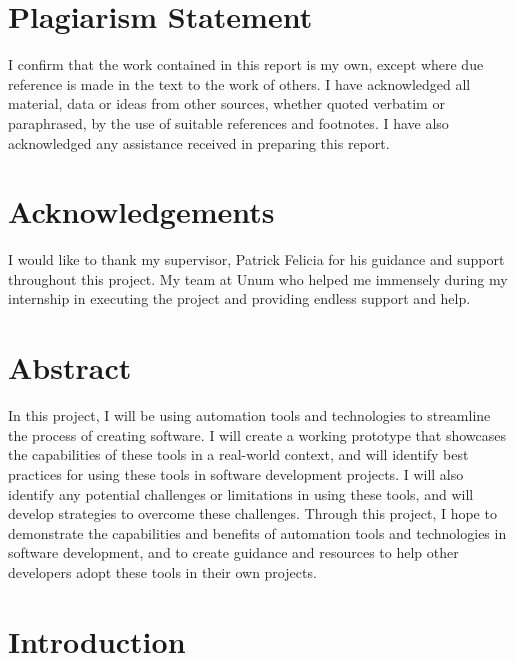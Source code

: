 \documentclass[
  10pt,
  paper=a4,
  ,captions=tableheading
]{scrartcl}
\begin{document}



{
\setcounter{tocdepth}{3}
\tableofcontents
\newpage
}
\hypertarget{plagiarism-statement}{%
\section{Plagiarism Statement}\label{plagiarism-statement}}

I confirm that the work contained in this report is my own, except where
due reference is made in the text to the work of others. I have
acknowledged all material, data or ideas from other sources, whether
quoted verbatim or paraphrased, by the use of suitable references and
footnotes. I have also acknowledged any assistance received in preparing
this report.

\hypertarget{acknowledgements}{%
\section{Acknowledgements}\label{acknowledgements}}

I would like to thank my supervisor, Patrick Felicia for his guidance
and support throughout this project. My team at Unum who helped me
immensely during my internship in executing the project and providing
endless support and help.

\hypertarget{abstract}{%
\section{Abstract}\label{abstract}}

In this project, I will be using automation tools and technologies to
streamline the process of creating software. I will create a working
prototype that showcases the capabilities of these tools in a real-world
context, and will identify best practices for using these tools in
software development projects. I will also identify any potential
challenges or limitations in using these tools, and will develop
strategies to overcome these challenges. Through this project, I hope to
demonstrate the capabilities and benefits of automation tools and
technologies in software development, and to create guidance and
resources to help other developers adopt these tools in their own
projects.

\hypertarget{introduction}{%
\section{Introduction}\label{introduction}}
\end{document}
